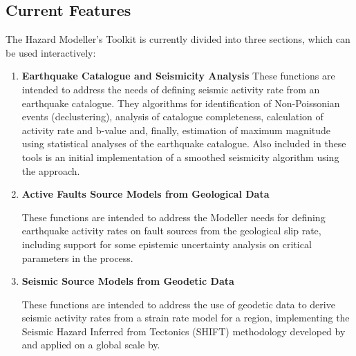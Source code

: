 \subsection{Current Features}

The Hazard Modeller's Toolkit is currently divided into three sections, which can be used interactively: 

\begin{enumerate}
\item \textbf{Earthquake Catalogue and Seismicity Analysis}
    These functions are intended to address the needs of defining seismic activity rate from an earthquake catalogue. They algorithms for identification of Non-Poissonian events (declustering), analysis of catalogue completeness, calculation of activity rate and b-value and, finally, estimation of maximum magnitude using statistical analyses of the earthquake catalogue. Also included in these tools is an initial implementation of a smoothed seismicity algorithm using the \cite{frankel1995} approach.
     
\item \textbf{Active Faults Source Models from Geological Data}

    These functions are intended to address the Modeller needs for defining earthquake activity rates on fault sources from the geological slip rate, including support for some epistemic uncertainty analysis on critical parameters in the process.

\item \textbf{Seismic Source Models from Geodetic Data}

    These functions are intended to address the use of geodetic data to derive seismic activity rates from a strain rate model for a region, implementing the Seismic Hazard Inferred from Tectonics (SHIFT) methodology developed by \cite{BirdLiu2007} and applied on a global scale by\cite{Bird_etal2010}.
\end{enumerate}

